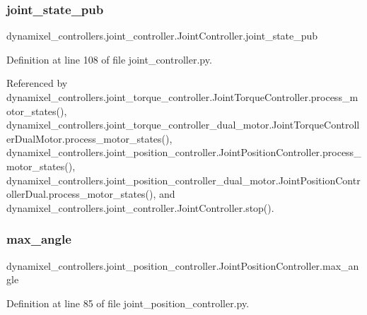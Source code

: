 \subsubsection{\texorpdfstring{joint\+\_\+state\+\_\+pub}{joint\_state\_pub}}
{\footnotesize\ttfamily dynamixel\+\_\+controllers.\+joint\+\_\+controller.\+Joint\+Controller.\+joint\+\_\+state\+\_\+pub\hspace{0.3cm}{\ttfamily [inherited]}}



Definition at line 108 of file joint\+\_\+controller.\+py.



Referenced by dynamixel\+\_\+controllers.\+joint\+\_\+torque\+\_\+controller.\+Joint\+Torque\+Controller.\+process\+\_\+motor\+\_\+states(), dynamixel\+\_\+controllers.\+joint\+\_\+torque\+\_\+controller\+\_\+dual\+\_\+motor.\+Joint\+Torque\+Controller\+Dual\+Motor.\+process\+\_\+motor\+\_\+states(), dynamixel\+\_\+controllers.\+joint\+\_\+position\+\_\+controller.\+Joint\+Position\+Controller.\+process\+\_\+motor\+\_\+states(), dynamixel\+\_\+controllers.\+joint\+\_\+position\+\_\+controller\+\_\+dual\+\_\+motor.\+Joint\+Position\+Controller\+Dual.\+process\+\_\+motor\+\_\+states(), and dynamixel\+\_\+controllers.\+joint\+\_\+controller.\+Joint\+Controller.\+stop().

\mbox{\label{classdynamixel__controllers_1_1joint__position__controller_1_1_joint_position_controller_a23906978a3dada860497b0bc1b22ab70}} 
\subsubsection{\texorpdfstring{max\+\_\+angle}{max\_angle}}
{\footnotesize\ttfamily dynamixel\+\_\+controllers.\+joint\+\_\+position\+\_\+controller.\+Joint\+Position\+Controller.\+max\+\_\+angle}



Definition at line 85 of file joint\+\_\+position\+\_\+controller.\+py.



